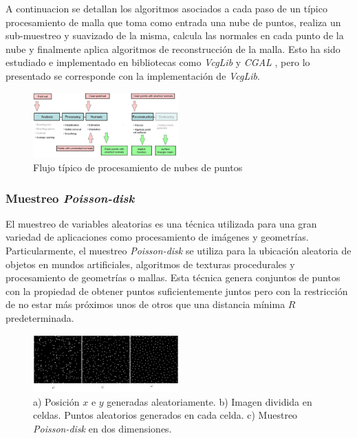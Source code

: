 A continuacion se detallan los algoritmos asociados a cada paso de un típico procesamiento de malla que toma como entrada una nube de puntos, realiza un sub-muestreo y suavizado de la misma, calcula las normales en cada punto de la nube y finalmente aplica algoritmos de reconstrucción de la malla. Esto ha sido estudiado e implementado en bibliotecas como \emph{VcgLib} \cite{VCGLib} y \emph{CGAL} \cite{CGAL}, pero lo presentado se corresponde con la implementación de \emph{VcgLib}. 

\begin{figure}[H]
  \centering
    \includegraphics[width=0.5\textwidth]{./Cap2_videomapping/malla-flow.png}
  \caption{Flujo típico de procesamiento de nubes de puntos \cite{CGAL}}
  \label{fig:Mesh-CGAL}
\end{figure}

\subsubsection{Muestreo \emph{Poisson-disk}}

El muestreo de variables aleatorias es una técnica utilizada para una gran variedad de aplicaciones como procesamiento de imágenes y geometrías. Particularmente, el muestreo \emph{Poisson-disk} se utiliza para la ubicación aleatoria de objetos en mundos artificiales, algoritmos de texturas procedurales y procesamiento de geometrías o mallas.%
Esta técnica genera conjuntos de puntos con la propiedad de obtener puntos suficientemente juntos pero con la restricción de no estar más próximos unos de otros que una distancia mínima $R$ predeterminada.

\begin{figure}[H]
  \centering
    \includegraphics[width=0.5\textwidth]{./Cap2_videomapping/malla-poisson.png}
  \caption{a) Posición $x$ e $y$ generadas aleatoriamente. b) Imagen dividida en celdas. Puntos aleatorios generados en cada celda. c) Muestreo \emph{Poisson-disk} en dos dimensiones.}
  \label{fig:Mesh-Poisson}
\end{figure}

